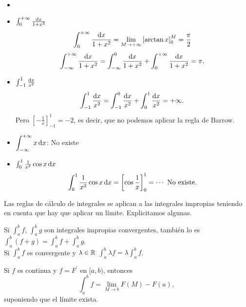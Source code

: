 \begin{example}
    \begin{itemize}
        \item[]
        \item $\int^{+\infty}_0 \frac{\dif x}{1+x^2}$
            \[
                \int^{+\infty}_0 \frac{\dif x}{1+x^2} =
                \lim_{M \to +\infty} \left[\arctan x\right]^M_0 =
                \frac{\pi}{2}
            \]
            \[
                \int^{+\infty}_{-\infty} \frac{\dif x}{1+x^2} =
                \int^0_{-\infty} \frac{\dif x}{1+x^2} +
                \int^{+\infty}_0 \frac{\dif x}{1+x^2} = \pi.
            \]
        \item $\int^1_{-1} \frac{\dif x}{x^2}$
            \[
                \int^1_{-1} \frac{\dif x}{x^2} = \int^0_{-1}
                \frac{\dif x}{x^2} + \int^1_0 \frac{\dif x}{x^2} =
                +\infty.
            \]
            Pero $\left[-\frac{1}{x}\right]^1_{-1} = -2$, es decir, que no
            podemos aplicar la regla de Barrow.
        \item $\displaystyle \int^{+\infty}_{-\infty} x\dif x$: No existe
        \item $\int^1_0 \frac{1}{x^2}\cos x \dif x$
            \[
                \int^1_0 \frac{1}{x^2}\cos x \dif x =
                \left[ \cos \frac{1}{x} \right]^1_0 = \cdots
                \text{ No existe.}
            \]
    \end{itemize}
\end{example}

\begin{obs}
    Las reglas de cálculo de integrales se aplican a las integrales impropias
    teniendo en cuenta que hay que aplicar un límite. Explicitamos algunas.
\end{obs}

\begin{prop}[Linealidad]
    Si $\int^b_a f$, $\int^b_a g$ son integrales impropias convergentes, tambi\'en
    lo es $\int^b_a (f+g) = \int^b_a f + \int^b_a g$.
    \\
    Si $\int^b_a f$ es convergente y $\lambda \in \mathbb{R}$ $\int^b_a \lambda f =
    \lambda \int^b_a f$.
\end{prop}

\begin{prop}
    Si $f$ es continua y $f = F^\prime$ en $[a,b)$, entonces
    \[
        \int^b_a f = \lim_{M \to b} F(M) - F(a),
    \]
    suponiendo que el límite exista.
\end{prop}

